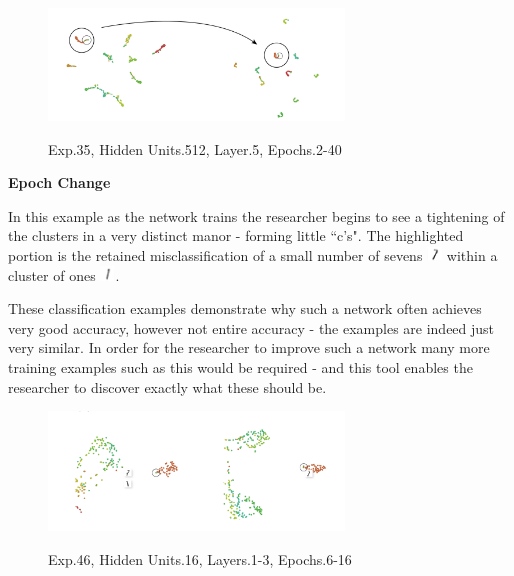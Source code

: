 \documentclass[a4paper,11pt,titlepage]{article}
\begin{document}
	\begin{figure}[H]
    			\centering	
			{{\includegraphics[width=0.7\textwidth]
    				{img/conc_X35_H512_L5_E2-40.png} 
    			}}%
    			\caption{Exp.35, Hidden Units.512, Layer.5, Epochs.2-40}%
    		\label{fig:mnistHinton}
	\end{figure}
	
	\textbf{Epoch Change}
	\par 
	In this example as the network trains the researcher begins to see a tightening of the clusters in a very distinct manor - forming little ``c's". The highlighted portion is the retained misclassification of a small number of sevens {\includegraphics[width=0.4cm]{img/seven_one-01.png}}  within a cluster of ones {\includegraphics[width=0.4cm]{img/seven_one-02.png}}.
	\par 
	These classification examples demonstrate why such a network often achieves very good accuracy, however not entire accuracy - the examples are indeed just very similar. In order for the researcher to improve such a network many more training examples such as this would be required - and this tool enables the researcher to discover exactly what these should be.

	\begin{figure}[H]
    			\centering	
			{{\includegraphics[width=0.7\textwidth]
    				{img/conc_X46_H16_L1-3_E6-16.png} 
    			}}%
    			\caption{Exp.46, Hidden Units.16, Layers.1-3, Epochs.6-16}%
    		\label{fig:mnistHinton}
	\end{figure}
	
\end{document}
